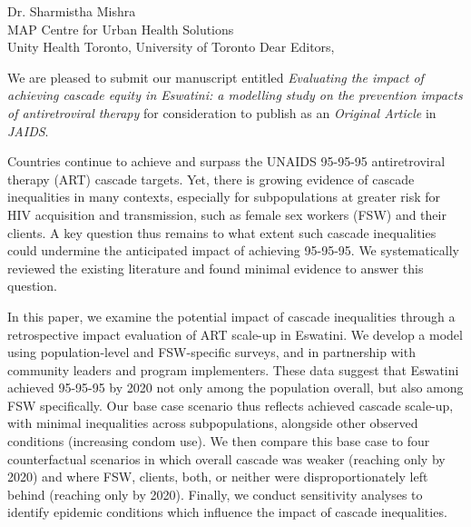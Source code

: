 \address{
  Dr. William A. Blattner\\
  Editor-in-Chief\\
  Journal of Acquired Immune Deficiency Syndromes
}{Dr. Sharmistha Mishra\\
  MAP Centre for Urban Health Solutions\\
  Unity Health Toronto, University of Toronto}
Dear Editors,
\par
We are pleased to submit our manuscript entitled
\emph{Evaluating the impact of achieving cascade equity in Eswatini: %
  a modelling study on the prevention impacts of antiretroviral therapy}
for consideration to publish as an \emph{Original Article} in \emph{JAIDS}.
\par
Countries continue to achieve and surpass
the UNAIDS 95-95-95 antiretroviral therapy (ART) cascade targets.
Yet, there is growing evidence of cascade inequalities in many contexts,
especially for subpopulations at greater risk for HIV acquisition and transmission,
such as female sex workers (FSW) and their clients.
A key question thus remains to what extent
such cascade inequalities could undermine the anticipated impact of achieving 95-95-95.
We systematically reviewed the existing literature
and found minimal evidence to answer this question.
\par
In this paper, we examine the potential impact of cascade inequalities
through a retrospective impact evaluation of ART scale-up in Eswatini.
We develop a model using population-level and FSW-specific surveys,
and in partnership with community leaders and program implementers.
These data suggest that Eswatini achieved 95-95-95 by 2020
not only among the population overall, but also among FSW specifically.
Our base case scenario thus reflects achieved cascade scale-up,
with minimal inequalities across subpopulations,
alongside other observed conditions (\eg increasing condom use).
We then compare this base case to four counterfactual scenarios in which
overall cascade was weaker (reaching only \casmd by 2020) and where
FSW, clients, both, or neither were disproportionately left behind
(reaching only \caslo by 2020).
Finally, we conduct sensitivity analyses to identify epidemic conditions
which influence the impact of cascade inequalities.
